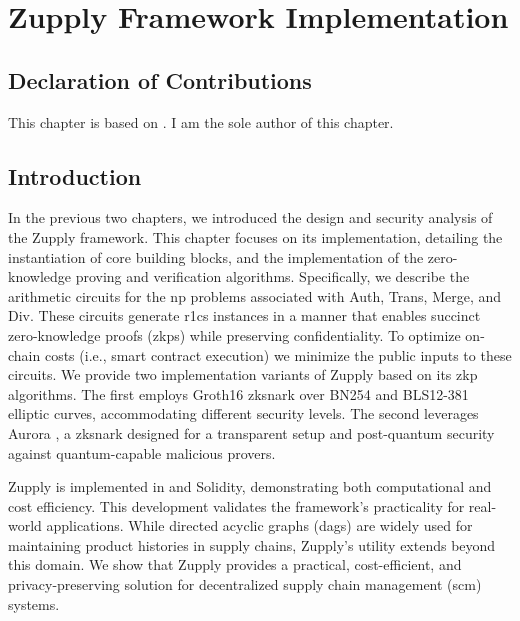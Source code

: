 \chapter{Zupply Framework Implementation}\label{ch:zupply_implementation}

\section*{Declaration of Contributions}
This chapter is based on \cite{Badakhshan2024Zupply}. I am the sole author of this chapter.

\section{Introduction}

In the previous two chapters, we introduced the design and security analysis of the Zupply framework. This chapter focuses on its implementation, detailing the 
instantiation of core building blocks, and the implementation of the zero-knowledge proving and verification algorithms. Specifically, we describe the arithmetic circuits for the \gls{np} problems associated with \textsf{Auth}, \textsf{Trans}, \textsf{Merge}, and \textsf{Div}. These circuits generate \gls{r1cs} instances in a manner that enables succinct zero-knowledge proofs (\gls{zkp}s) while preserving confidentiality. To optimize on-chain costs (i.e., smart contract execution) we minimize the public inputs to these circuits. 
We provide two implementation variants of Zupply based on its \gls{zkp} algorithms. The first employs Groth16 \cite{Groth2016} \gls{zksnark} over BN254 \cite{BNcurve} and BLS12-381 \cite{BLS_curve2003} elliptic curves, accommodating different security levels. The second leverages Aurora \cite{Aurora2019}, a \gls{zksnark} designed for a transparent setup and post-quantum security against quantum-capable malicious provers.

Zupply is implemented in \CC and Solidity, demonstrating both computational and cost efficiency. This development validates the framework's practicality for real-world applications. While directed acyclic graphs (\gls{dag}s) are widely used for maintaining product histories in supply chains, Zupply's utility extends beyond this domain. We show that Zupply provides a practical, cost-efficient, and privacy-preserving solution for decentralized supply chain management (\gls{scm}) systems.

